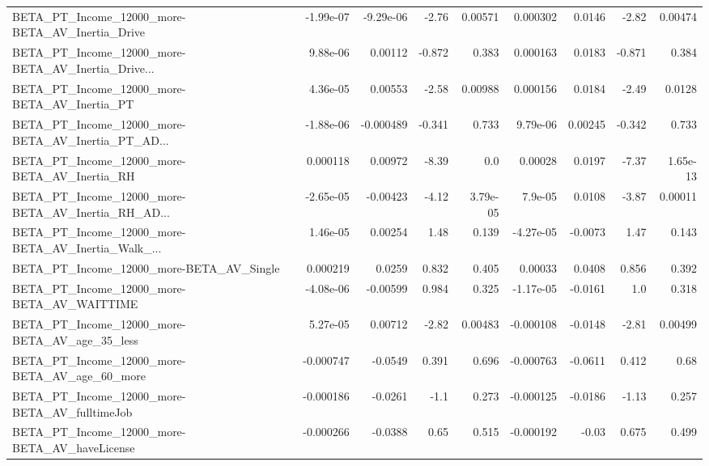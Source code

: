 \begin{tabular}{lrrrrrrrr}
BETA\_PT\_Income\_12000\_more-BETA\_AV\_Inertia\_Drive    &   -1.99e-07 &    -9.29e-06 &    -2.76 &  0.00571 &   0.000302 &      0.0146 &        -2.82 &       0.00474 \\
BETA\_PT\_Income\_12000\_more-BETA\_AV\_Inertia\_Drive... &    9.88e-06 &      0.00112 &   -0.872 &    0.383 &   0.000163 &      0.0183 &       -0.871 &         0.384 \\
BETA\_PT\_Income\_12000\_more-BETA\_AV\_Inertia\_PT       &    4.36e-05 &      0.00553 &    -2.58 &  0.00988 &   0.000156 &      0.0184 &        -2.49 &        0.0128 \\
BETA\_PT\_Income\_12000\_more-BETA\_AV\_Inertia\_PT\_AD... &   -1.88e-06 &    -0.000489 &   -0.341 &    0.733 &   9.79e-06 &     0.00245 &       -0.342 &         0.733 \\
BETA\_PT\_Income\_12000\_more-BETA\_AV\_Inertia\_RH       &    0.000118 &      0.00972 &    -8.39 &      0.0 &    0.00028 &      0.0197 &        -7.37 &      1.65e-13 \\
BETA\_PT\_Income\_12000\_more-BETA\_AV\_Inertia\_RH\_AD... &   -2.65e-05 &     -0.00423 &    -4.12 & 3.79e-05 &    7.9e-05 &      0.0108 &        -3.87 &       0.00011 \\
BETA\_PT\_Income\_12000\_more-BETA\_AV\_Inertia\_Walk\_... &    1.46e-05 &      0.00254 &     1.48 &    0.139 &  -4.27e-05 &     -0.0073 &         1.47 &         0.143 \\
BETA\_PT\_Income\_12000\_more-BETA\_AV\_Single           &    0.000219 &       0.0259 &    0.832 &    0.405 &    0.00033 &      0.0408 &        0.856 &         0.392 \\
BETA\_PT\_Income\_12000\_more-BETA\_AV\_WAITTIME         &   -4.08e-06 &     -0.00599 &    0.984 &    0.325 &  -1.17e-05 &     -0.0161 &          1.0 &         0.318 \\
BETA\_PT\_Income\_12000\_more-BETA\_AV\_age\_35\_less      &    5.27e-05 &      0.00712 &    -2.82 &  0.00483 &  -0.000108 &     -0.0148 &        -2.81 &       0.00499 \\
BETA\_PT\_Income\_12000\_more-BETA\_AV\_age\_60\_more      &   -0.000747 &      -0.0549 &    0.391 &    0.696 &  -0.000763 &     -0.0611 &        0.412 &          0.68 \\
BETA\_PT\_Income\_12000\_more-BETA\_AV\_fulltimeJob      &   -0.000186 &      -0.0261 &     -1.1 &    0.273 &  -0.000125 &     -0.0186 &        -1.13 &         0.257 \\
BETA\_PT\_Income\_12000\_more-BETA\_AV\_haveLicense      &   -0.000266 &      -0.0388 &     0.65 &    0.515 &  -0.000192 &       -0.03 &        0.675 &         0.499 \\

\end{tabular}

